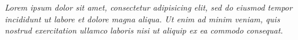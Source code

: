 \begin{dedicatoria}
   \vspace*{\fill}
   \centering
   \noindent
   \textit{Lorem ipsum dolor sit amet, consectetur adipisicing elit, sed do eiusmod tempor incididunt ut labore et dolore magna aliqua. Ut enim ad minim veniam, quis nostrud exercitation ullamco laboris nisi ut aliquip ex ea commodo consequat.} \vspace*{\fill}
\end{dedicatoria}
